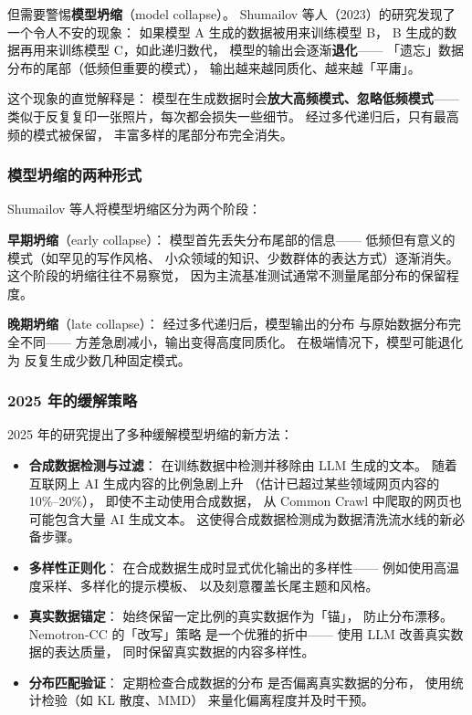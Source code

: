 但需要警惕\textbf{模型坍缩}（model collapse）。
Shumailov 等人（2023）的研究发现了一个令人不安的现象：
如果模型 A 生成的数据被用来训练模型 B，
B 生成的数据再用来训练模型 C，如此递归数代，
模型的输出会逐渐\textbf{退化}——
「遗忘」数据分布的尾部（低频但重要的模式），
输出越来越同质化、越来越「平庸」。

这个现象的直觉解释是：
模型在生成数据时会\textbf{放大高频模式、忽略低频模式}——
类似于反复复印一张照片，每次都会损失一些细节。
经过多代递归后，只有最高频的模式被保留，
丰富多样的尾部分布完全消失。

\subsubsection{模型坍缩的两种形式}

Shumailov 等人将模型坍缩区分为两个阶段：

\textbf{早期坍缩}（early collapse）：
模型首先丢失分布尾部的信息——
低频但有意义的模式（如罕见的写作风格、
小众领域的知识、少数群体的表达方式）逐渐消失。
这个阶段的坍缩往往不易察觉，
因为主流基准测试通常不测量尾部分布的保留程度。

\textbf{晚期坍缩}（late collapse）：
经过多代递归后，模型输出的分布
与原始数据分布完全不同——
方差急剧减小，输出变得高度同质化。
在极端情况下，模型可能退化为
反复生成少数几种固定模式。

\subsubsection{2025 年的缓解策略}

2025 年的研究提出了多种缓解模型坍缩的新方法：

\begin{itemize}[noitemsep]
  \item \textbf{合成数据检测与过滤}：
        在训练数据中检测并移除由 LLM 生成的文本。
        随着互联网上 AI 生成内容的比例急剧上升
        （估计已超过某些领域网页内容的 10\%--20\%），
        即使不主动使用合成数据，
        从 Common Crawl 中爬取的网页也可能包含大量 AI 生成文本。
        这使得合成数据检测成为数据清洗流水线的新必备步骤。
  \item \textbf{多样性正则化}：
        在合成数据生成时显式优化输出的多样性——
        例如使用高温度采样、多样化的提示模板、
        以及刻意覆盖长尾主题和风格。
  \item \textbf{真实数据锚定}：
        始终保留一定比例的真实数据作为「锚」，
        防止分布漂移。Nemotron-CC 的「改写」策略
        是一个优雅的折中——
        使用 LLM 改善真实数据的表达质量，
        同时保留真实数据的内容多样性。
  \item \textbf{分布匹配验证}：
        定期检查合成数据的分布
        是否偏离真实数据的分布，
        使用统计检验（如 KL 散度、MMD）
        来量化偏离程度并及时干预。
\end{itemize}

